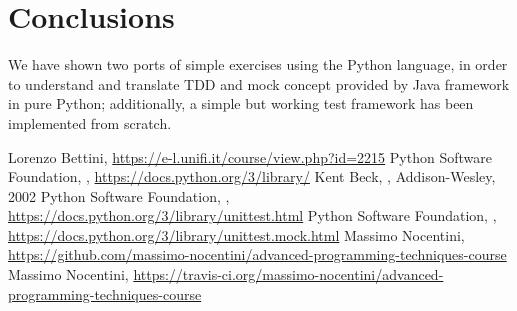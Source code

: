 \documentclass[12pt]{article}
\begin{document}
\section{Conclusions}

We have shown two ports of simple exercises using the Python language,
in order to understand and translate TDD and mock concept provided by
Java framework in pure Python; additionally, a simple but working
test framework has been implemented from scratch.


\begin{thebibliography}{10}

Lorenzo Bettini,
\newblock \url{https://e-l.unifi.it/course/view.php?id=2215}
%
Python Software Foundation,
,
\newblock \url{https://docs.python.org/3/library/}
%
Kent Beck,
,
\newblock Addison-Wesley, 2002
%
Python Software Foundation,
,
\newblock \url{https://docs.python.org/3/library/unittest.html}
%
Python Software Foundation,
,
\newblock \url{https://docs.python.org/3/library/unittest.mock.html}
%
Massimo Nocentini,
\newblock \url{https://github.com/massimo-nocentini/advanced-programming-techniques-course}
%
Massimo Nocentini,
\newblock \url{https://travis-ci.org/massimo-nocentini/advanced-programming-techniques-course}
%
\end{thebibliography}
\end{document}
